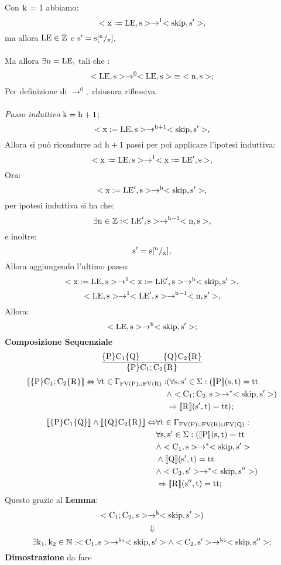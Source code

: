 \documentclass[a4paper, 12pt, oneside,fleqn]{book}
\begin{document}
Con $\mathrm{k}$ = 1 abbiamo: 
$$<\mathrm{x}:=\mathrm{LE},\mathrm{s}>\rightarrow ^1<\mathrm{skip},\mathrm{s}'>,$$
ma allora $\mathrm{LE} \in \mathbb{Z}$ e $\mathrm{s}'= \mathrm{s}[^\mathrm{n}/_{\mathrm{x}}],$\\\\
Ma allora $\exists\mathrm{n} = \mathrm{LE},$ tali che :
$$<\mathrm{LE},\mathrm{s}>\rightarrow ^0<\mathrm{LE},\mathrm{s}> \hspace{1mm} \equiv \hspace{1mm} <\mathrm{n},\mathrm{s}>;$$
Per definizione di $\rightarrow ^0,$ chiusura riflessiva.\\\\
\textit{Passo induttivo}
$\mathrm{k} = \mathrm{h}+1$;
$$<\mathrm{x}:=\mathrm{LE},\mathrm{s}>\rightarrow ^\mathrm{h+1}<\mathrm{skip},\mathrm{s}'>,$$
Allora si può ricondurre ad $\mathrm{h+1}$ passi per poi applicare l'ipotesi induttiva:
$$<\mathrm{x}:=\mathrm{LE},\mathrm{s}>\rightarrow ^1<\mathrm{x}:=\mathrm{LE}',\mathrm{s}>,$$
Ora:
$$<\mathrm{x}:=\mathrm{LE}',\mathrm{s}>\rightarrow ^\mathrm{h}<\mathrm{skip},\mathrm{s}'>,$$
per ipotesi induttiva si ha che:
$$\exists \mathrm{n} \in \mathbb{Z}\mathrel{:} <\mathrm{LE}',\mathrm{s}>\rightarrow ^\mathrm{{h}-1}<\mathrm{n},\mathrm{s}>,$$
e inoltre:
$$ \mathrm{s}'= \mathrm{s}[^\mathrm{n}/_{\mathrm{x}}],$$
Allora aggiungendo l'ultimo passo: 
$$<\mathrm{x}:=\mathrm{LE},\mathrm{s}>\rightarrow ^1<\mathrm{x}:=\mathrm{LE}',\mathrm{s}>\rightarrow ^\mathrm{h}<\mathrm{skip},\mathrm{s}'>,$$
$$<\mathrm{LE},\mathrm{s}>\rightarrow ^1<\mathrm{LE}',\mathrm{s}>\rightarrow ^\mathrm{{h}-1}<\mathrm{n},\mathrm{s}'>, $$
Allora:
$$<\mathrm{LE},\mathrm{s}>\rightarrow ^\mathrm{h}<\mathrm{skip},\mathrm{s}'>;$$
\textbf{Composizione Sequenziale}
$$\frac{\{\mathrm{P}\}\mathrm{C}_1\{\mathrm{Q}\} \hspace{1cm} \{\mathrm{Q}\}\mathrm{C}_2\{\mathrm{R}\}}{\{\mathrm{P}\}\mathrm{C}_1;\mathrm{C}_2\{\mathrm{R}\}}$$
\begin{align*}
\llbracket \{\mathrm{P}\}\mathrm{C}_1;\mathrm{C}_2\{\mathrm{R}\} \rrbracket \Leftrightarrow \forall \mathrm{t} \in \Gamma_{\mathrm{FV}(\mathrm{P})\cup \mathrm{FV}(\mathrm{R})}\mathrel{:}
&(\forall \mathrm{s},\mathrm{s}'\in \Sigma \mathrel{:}(\llbracket \mathrm{P} \rrbracket(\mathrm{s},\mathrm{t}) = \mathrm{tt} \\
&\wedge <\mathrm{C}_1; \mathrm{C}_2,\mathrm{s}>\rightarrow ^*<\mathrm{skip},\mathrm{s}'>) \\
&\Rightarrow\llbracket \mathrm{R} \rrbracket(\mathrm{s}',\mathrm{t})=\mathrm{tt});
\end{align*}
\begin{align*}
\llbracket \{\mathrm{P}\}\mathrm{C}_1\{\mathrm{Q}\} \rrbracket \wedge \llbracket \{\mathrm{Q}\}\mathrm{C}_2\{\mathrm{R}\} \rrbracket \Leftrightarrow
&\forall \mathrm{t} \in \Gamma_{\mathrm{FV}(\mathrm{P})\cup\mathrm{FV}(\mathrm{R})\cup\mathrm{FV}(\mathrm{Q})}\mathrel{:}\\
&\forall \mathrm{s},\mathrm{s}'\in \Sigma \mathrel{:}(\llbracket \mathrm{P} \rrbracket(\mathrm{s},\mathrm{t}) = \mathrm{tt}\\
&\wedge <\mathrm{C}_1,\mathrm{s}>\rightarrow ^*<\mathrm{skip},\mathrm{s}'>\\
&\wedge \llbracket\mathrm{Q}\rrbracket(\mathrm{s}',\mathrm{t})=\mathrm{tt} \\
&\wedge <\mathrm{C}_2,\mathrm{s}'>\rightarrow ^*<\mathrm{skip},\mathrm{s}''>)\\
&\Rightarrow\llbracket \mathrm{R} \rrbracket(\mathrm{s}'',\mathrm{t})=\mathrm{tt};
\end{align*}
Questo grazie al \textbf{Lemma}:
$$<\mathrm{C}_1; \mathrm{C}_2,s>\rightarrow ^{\mathrm{k}}<\mathrm{skip},\mathrm{s}'>)$$ 
$$\Downarrow$$
$$\exists \mathrm{k}_1,\mathrm{k}_2 \in \mathbb{N}\mathrel{:}<\mathrm{C}_1,\mathrm{s}>\rightarrow ^{\mathrm{k}_1}<\mathrm{skip},\mathrm{s}'> \wedge <\mathrm{C}_2,\mathrm{s}'>\rightarrow ^{\mathrm{k}_2}<\mathrm{skip},\mathrm{s}''>;$$ 
\textbf{Dimostrazione} da fare
\end{document}
